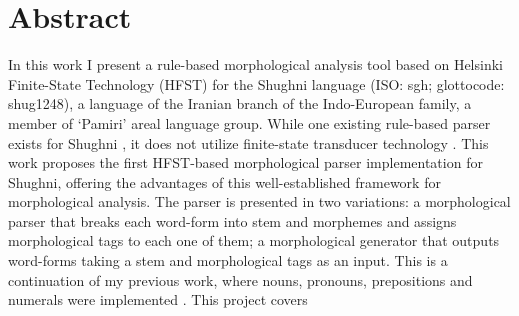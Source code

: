 \section*{Abstract}

In this work I present a rule-based morphological analysis tool based on Helsinki Finite-State Technology (HFST) for the Shughni language (ISO: sgh; glottocode: shug1248), a language of the Iranian branch of the Indo-European family, a member of `Pamiri' areal language group. While one existing rule-based parser exists for Shughni \parencite{melenchenko_2021_parser}, it does not utilize finite-state transducer technology . This work proposes the first HFST-based morphological parser implementation for Shughni, offering the advantages of this well-established framework for morphological analysis. The parser is presented in two variations: a morphological parser that breaks each word-form into stem and morphemes and assigns morphological tags to each one of them; a morphological generator that outputs word-forms taking a stem and morphological tags as an input.  This is a continuation of my previous work, where nouns, pronouns, prepositions and numerals were implemented \parencite{osorgin_2024_twol}. This project covers 


\newpage